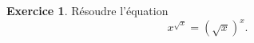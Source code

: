 \documentclass[a4paper, 11pt,openany]{article}%
\theoremstyle{plain}
\theoremstyle{definition}
\newtheorem{exo}{Exercice}
\newtheorem{sol}{Solution de l'exercice}
\theoremstyle{remark}
\newcommand{\Z}{\mathbb{Z}}
\begin{document}




\begin{exo}
Résoudre l'équation 
\[ x^{\sqrt{x}} =(\sqrt{x})^x.\]
\end{exo}

   
\end{document}
